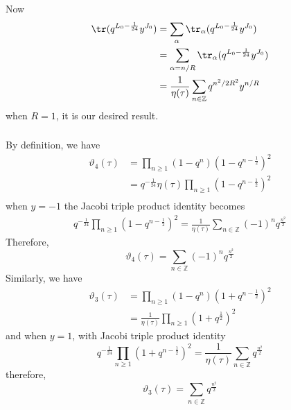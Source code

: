 Now 
\begin{equation}
	\begin{split}
	\tr(q^{L_0 -\frac{1}{24}} y^{J_0}) & = \sum_{\alpha} \tr_{\alpha}(q^{L_0 -\frac{1}{24}} y^{J_0})\\
	& = \sum_{\alpha = n/R} \tr_{\alpha}(q^{L_0 -\frac{1}{24}} y^{J_0})\\
	& = \frac{1}{\eta(\tau)}\sum_{n\in \mathbb{Z}} q^{n^2/2R^2}y^{n/R}
	\end{split}
\end{equation}
when $R=1$, it is our desired result.
\subsubsection{}
By definition, we have 
\begin{equation}
	\begin{split}
	\vartheta_4(\tau) & = \prod_{n\geq 1} (1-q^n) (1- q^{n-\frac{1}{2}})^2 \\
	& = q^{-\frac{1}{24}} \eta(\tau) \prod_{n \geq 1} (1- q^{n-\frac{1}{2}})^2\\
	\end{split}
\end{equation}
when $y = -1$ the Jacobi triple product identity becomes 
\begin{equation}
	\begin{split}
	q^{-\frac{1}{24}} \prod_{n \geq 1} (1- q^{n-\frac{1}{2}})^2 = \frac{1}{\eta(\tau)} \sum_{n\in \mathbb{Z}} (-1)^n q^{\frac{n^2}{2}}
	\end{split}
\end{equation}
Therefore, 
\begin{equation}
	\vartheta_4(\tau) = \sum_{n \in \mathbb{Z}} (-1)^n q^{\frac{n^2}{2}}
\end{equation}
Similarly, we have 
\begin{equation}
	\begin{split}
	\vartheta_3(\tau) & = \prod_{n \geq 1} (1-q^n)(1+ q^{n-\frac{1}{2}})^2\\
	& = \frac{1}{\eta(\tau)} \prod_{n \geq 1} (1+ q^{\frac{1}{2}})^2
	\end{split}
\end{equation}
and when $y =1$, with Jacobi triple product identity
\begin{equation}
		q^{-\frac{1}{24}} \prod_{n \geq 1} (1+ q^{n-\frac{1}{2}})^2 = \frac{1}{\eta(\tau)} \sum_{n\in \mathbb{Z}}  q^{\frac{n^2}{2}}
\end{equation}
therefore,
\begin{equation}
	\vartheta_3(\tau) = \sum_{n \in \mathbb{Z}} q^{\frac{n^2}{2}}
\end{equation}
